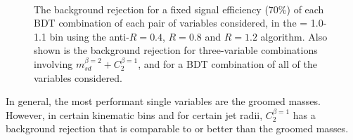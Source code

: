 \begin{figure}
\centering
{}
\\
\caption{The background rejection
for a fixed signal efficiency (70\%) of each BDT combination of
each pair of variables considered, in the \pt = 1.0-1.1 \TeV bin using
the anti-\kT $R=0.4$, $R=0.8$ and $R=1.2$ algorithm. Also shown is the background
rejection for three-variable combinations involving $m_{sd}^{\beta=2} +
C_2^{\beta=1}$, and for a BDT combination of all of the variables considered.}
\label{fig:pt1000_comb2D}
\end{figure}



In general, the most performant single variables are
the groomed masses. However, in certain kinematic bins and for certain
jet radii, $C_2^{\beta=1}$ has a background rejection that is
comparable to or better than the groomed masses. 

